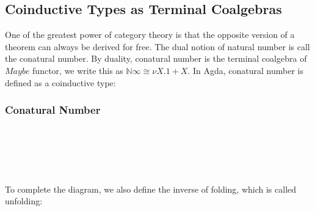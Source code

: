 \subsection{Coinductive Types as Terminal Coalgebras}

One of the greatest power of category theory is that the opposite version of a theorem can always be derived for free. The dual notion of natural number is call the conatural number. By duality, conatural number is the terminal coalgebra of $Maybe$ functor, we write this as $\mathbb{N}\infty \cong \nu X. 1 + X$. In Agda, conatural number is defined as a coinductive type:

\subsubsection*{Conatural Number}

\begin{code}%
\>[0]\AgdaSpace{}%
\AgdaSpace{}%
\AgdaSymbol{:}\AgdaSpace{}%
\AgdaSpace{}%
\<%
\\
\>[0][@{}l@{\AgdaIndent{0}}]%
\>[2]\<%
\\
%
\>[2]\<%
\\
\>[2][@{}l@{\AgdaIndent{0}}]%
\>[4]\AgdaSpace{}%
\AgdaSymbol{:}\AgdaSpace{}%
\AgdaSpace{}%
\AgdaSpace{}%
\<%
\\
\>[0]\AgdaSpace{}%
\<%
\end{code}

To complete the diagram, we also define the inverse of folding, which is called unfolding:

\begin{code}%
\>[0]\AgdaSpace{}%
\AgdaSymbol{:}\AgdaSpace{}%
\AgdaSymbol{(}\AgdaSpace{}%
\AgdaSpace{}%
\AgdaSpace{}%
\AgdaSpace{}%
\AgdaSymbol{)}\AgdaSpace{}%
\AgdaSpace{}%
\AgdaSpace{}%
\AgdaSpace{}%
\<%
\\
\>[0]\AgdaSpace{}%
\AgdaSymbol{(}\AgdaSpace{}%
\AgdaSpace{}%
\AgdaSymbol{)}\AgdaSpace{}%
\AgdaSpace{}%
\AgdaSpace{}%
\<%
\\
\>[0]\AgdaSpace{}%
\AgdaSymbol{|}\AgdaSpace{}%
\AgdaSpace{}%
\AgdaSpace{}%
\AgdaSymbol{=}\AgdaSpace{}%
\AgdaSpace{}%
\<%
\\
\>[0]\AgdaSpace{}%
\AgdaSymbol{|}\AgdaSpace{}%
\AgdaSpace{}%
\AgdaSpace{}%
\AgdaSymbol{=}\AgdaSpace{}%
\AgdaSpace{}%
\AgdaSymbol{(}\AgdaSpace{}%
\AgdaSpace{}%
\AgdaSymbol{)}\<%
\end{code}

